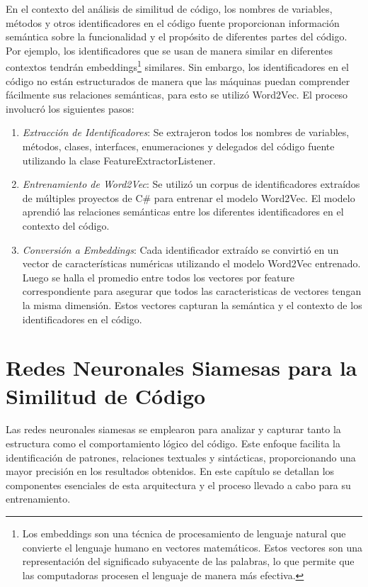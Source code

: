 En el contexto del análisis de similitud de código, los nombres de variables, métodos y otros identificadores en el código fuente proporcionan información semántica sobre la funcionalidad y el propósito de diferentes partes del código. Por ejemplo, los identificadores que se usan de manera similar en diferentes contextos tendrán embeddings\footnote{Los embeddings son una técnica de procesamiento de lenguaje natural que convierte el lenguaje humano en vectores matemáticos. Estos vectores son una representación del significado subyacente de las palabras, lo que permite que las computadoras procesen el lenguaje de manera más efectiva.} similares. Sin embargo, los identificadores en el código no están estructurados de manera que las máquinas puedan comprender fácilmente sus relaciones semánticas, para esto se utilizó Word2Vec. El proceso involucró los siguientes pasos:

\begin{enumerate}
	\item \textit{Extracción de Identificadores}: Se extrajeron todos los nombres de variables, métodos, clases, interfaces, enumeraciones y delegados del código fuente utilizando la clase FeatureExtractorListener.
	
	\item \textit{Entrenamiento de Word2Vec}: Se utilizó un corpus de identificadores extraídos de múltiples proyectos de C\# para entrenar el modelo Word2Vec. El modelo aprendió las relaciones semánticas entre los diferentes identificadores en el contexto del código.
	
	\item \textit{Conversión a Embeddings}: Cada identificador extraído se convirtió en un vector de características numéricas utilizando el modelo Word2Vec entrenado. Luego se halla el promedio entre todos los vectores por feature correspondiente para asegurar que todos las caracteristicas de vectores tengan la misma dimensión. Estos vectores capturan la semántica y el contexto de los identificadores en el código.
	 
\end{enumerate}


\chapter{Redes Neuronales Siamesas para la Similitud de Código}\label{chapter:proposal}

Las redes neuronales siamesas se emplearon para analizar y capturar tanto la estructura como el comportamiento lógico del código. Este enfoque facilita la identificación de patrones, relaciones textuales y sintácticas, proporcionando una mayor precisión en los resultados obtenidos. En este capítulo se detallan los componentes esenciales de esta arquitectura y el proceso llevado a cabo para su entrenamiento.

